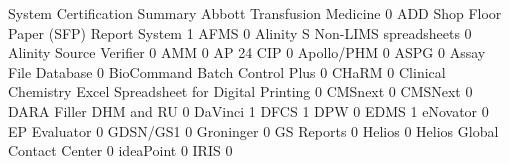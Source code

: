 \documentclass{article}
\begin{document}
\begin{Schunk}
\begin{Soutput}
                                                            System Certification Summary
  Abbott Transfusion Medicine                                                          0
  ADD Shop Floor Paper (SFP) Report System                                             1
  AFMS                                                                                 0
  Alinity S Non-LIMS spreadsheets                                                      0
  Alinity Source Verifier                                                              0
  AMM                                                                                  0
  AP 24 CIP                                                                            0
  Apollo/PHM                                                                           0
  ASPG                                                                                 0
  Assay File Database                                                                  0
  BioCommand Batch Control Plus                                                        0
  CHaRM                                                                                0
  Clinical Chemistry Excel Spreadsheet for Digital Printing                            0
  CMSnext                                                                              0
  CMSNext                                                                              0
  DARA Filler DHM and RU                                                               0
  DaVinci                                                                              1
  DFCS                                                                                 1
  DPW                                                                                  0
  EDMS                                                                                 1
  eNovator                                                                             0
  EP Evaluator                                                                         0
  GDSN/GS1                                                                             0
  Groninger                                                                            0
  GS Reports                                                                           0
  Helios                                                                               0
  Helios Global Contact Center                                                         0
  ideaPoint                                                                            0
  IRIS                                                                                 0

\end{Soutput}
\end{Schunk}
\end{document}
